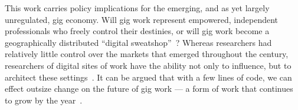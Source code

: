 \documentclass{article}
\newcommand{\topic}[1]{{\color{Blue}#1}}
\begin{document}
\topic{This work carries policy implications for the emerging, and as yet largely unregulated, gig economy.}
Will gig work represent empowered, independent professionals who freely control their destinies, or 
will gig work become a geographically distributed ``digital sweatshop''~\cite{dawnDigitalSweatshopCushing}?
Whereas researchers had relatively little control over the markets that emerged throughout the  century,
researchers of digital sites of work have the ability not only to influence, but to architect these settings~\cite{lessig2006code}.
It can be argued that with a few lines of code, we can effect outsize change on the future of gig work
--- a form of work that continues to grow by the year~\cite{pewSharing,pewSharing24percent}.

\end{document}
